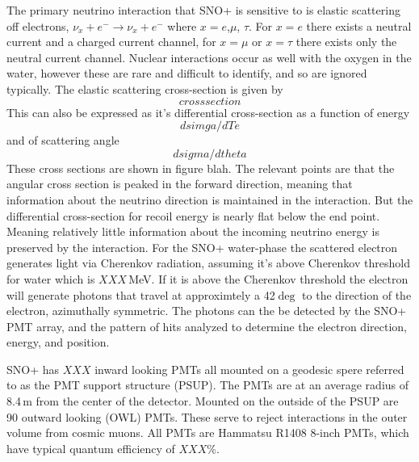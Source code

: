 The primary neutrino interaction that SNO+ is sensitive to is elastic scattering
off electrons,
$\nu_{x} + e^{-} \rightarrow \nu_{x} + e^{-}$
where $x=e$,$\mu$, $\tau$.
For $x=e$ there exists a neutral current and a charged current channel,
for $x=\mu$ or $x=\tau$ there exists only the neutral current channel.
Nuclear interactions occur as well with the oxygen in the water,
however these are rare and difficult to identify, and so are ignored typically.
The elastic scattering cross-section is given by
\begin{equation}
cross section
\end{equation}
This can also be expressed as it's differential cross-section as a function
of energy
\begin{equation}
dsimga/dTe
\end{equation}
and of scattering angle
\begin{equation}
dsigma/dtheta
\end{equation}
These cross sections are shown in figure blah.
The relevant points are that the angular cross section is peaked in
the forward direction, meaning that information about the neutrino direction
is maintained in the interaction.
But the differential cross-section for recoil energy is nearly flat below the
end point. Meaning relatively little information about the incoming neutrino energy
is preserved by the interaction.
For the SNO+ water-phase the scattered electron generates light via Cherenkov radiation,
assuming it's above Cherenkov threshold for water which is $XXX$\,MeV.
If it is above the Cherenkov threshold the electron will generate photons that
travel at approximtely a 42$\deg$ to the direction of the electron, azimuthally symmetric.
The photons can the be detected by the SNO+ PMT array, and the pattern
of hits analyzed to determine the electron direction, energy, and position.

SNO+ has $XXX$ inward looking PMTs all mounted on a geodesic spere referred to as
the PMT support structure (PSUP). The PMTs are at an average radius of 8.4\,m from
the center of the detector.
Mounted on the outside of the PSUP are 90 outward looking (OWL) PMTs.
These serve to reject interactions in the outer volume from cosmic muons.
All PMTs are Hammatsu R1408 8-inch PMTs, which have typical quantum efficiency
of  $XXX$\%.

